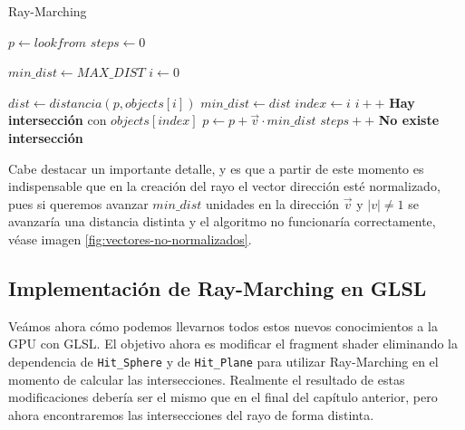 \begin{algorithm}[H]
\caption{Ray-Marching} \label{alg:Ray-Marching}
\begin{algorithmic}
\State $p\gets lookfrom$
\State $steps \gets 0$

 
    \State $min\_dist \gets MAX\_DIST$
    \State $i\gets 0$

    
        \State $dist \gets distancia(p, objects[i])$
            \State $min\_dist \gets dist$
            \State $index\gets i$
        \EndIf
        \State $i++$
    \EndWhile
        \State \textbf{Hay intersección} con $objects[index]$
    \Else
        \State $p\gets p + \vec v \cdot min\_dist$ 
    \EndIf
    \State $steps++$
\EndWhile
\State \textbf{No existe intersección}
\end{algorithmic}
\end{algorithm}

\begin{observacion}
\label{observacion:vector-normalizado}
    Cabe destacar un importante detalle, y es que a partir de este momento es indispensable que en la creación del rayo el vector dirección esté normalizado, pues si queremos avanzar $min\_dist$ unidades en la dirección $\vec v$ y $|v| \not= 1$ se avanzaría una distancia distinta y el algoritmo no funcionaría correctamente, véase imagen \ref{fig:vectores-no-normalizados}.
\end{observacion}

\subsection{Implementación de Ray-Marching en GLSL}

Veámos ahora cómo podemos llevarnos todos estos nuevos conocimientos a la GPU con GLSL. El objetivo ahora es modificar el fragment shader eliminando la dependencia de \verb|Hit_Sphere| y de \verb|Hit_Plane| para utilizar Ray-Marching en el momento de calcular las intersecciones. Realmente el resultado de estas modificaciones debería ser el mismo que en el final del capítulo anterior, pero ahora encontraremos las intersecciones del rayo de forma distinta. 

